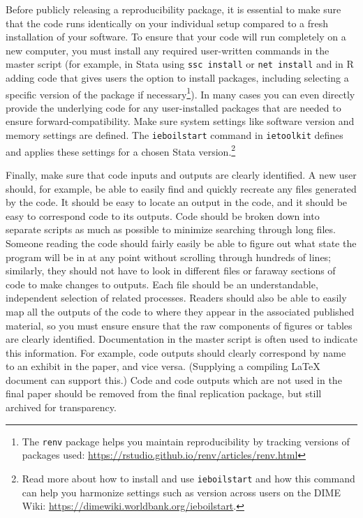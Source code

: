 \documentclass[
]{book}
\begin{document}
Before publicly releasing a reproducibility package,
it is essential to make sure that the code runs identically
on your individual setup compared to
a fresh installation of your software.
To ensure that your code will run completely on a new computer,
you must install any required user-written commands in the master script
(for example, in Stata using \texttt{ssc\ install} or \texttt{net\ install}
and in R adding code that gives users the option to install packages,
including selecting a specific version of the package if necessary\footnote{The \texttt{renv} package helps you maintain reproducibility by tracking versions of packages used:
  \url{https://rstudio.github.io/renv/articles/renv.html}}).
In many cases you can even directly provide the underlying code
for any user-installed packages that are needed to ensure forward-compatibility.
Make sure system settings like software version and memory settings are defined.
The \texttt{ieboilstart} command in \texttt{ietoolkit} defines and applies these settings
for a chosen Stata version.\footnote{Read more about how to install and use \texttt{ieboilstart}
  and how this command can help you
  harmonize settings such as version across users on the DIME Wiki:
  \url{https://dimewiki.worldbank.org/ieboilstart}.}

Finally, make sure that code inputs and outputs are clearly identified.
A new user should, for example, be able to easily find and quickly recreate
any files generated by the code.
It should be easy to locate an output in the code,
and it should be easy to correspond code to its outputs.
Code should be broken down into separate scripts as much as possible
to minimize searching through long files.
Someone reading the code should fairly easily be able to figure out
what state the program will be in at any point
without scrolling through hundreds of lines;
similarly, they should not have to look in different files
or faraway sections of code to make changes to outputs.
Each file should be an understandable, independent selection of related processes.
Readers should also be able to easily map all the outputs of the code
to where they appear in the associated published material,
so you must ensure ensure that the raw components of figures or tables are clearly identified.
Documentation in the master script is often used to indicate this information.
For example, code outputs should clearly correspond by name to an exhibit in the paper, and vice versa.
(Supplying a compiling LaTeX document can support this.)
Code and code outputs which are not used in the final paper should be removed from the final replication package,
but still archived for transparency.
\end{document}
